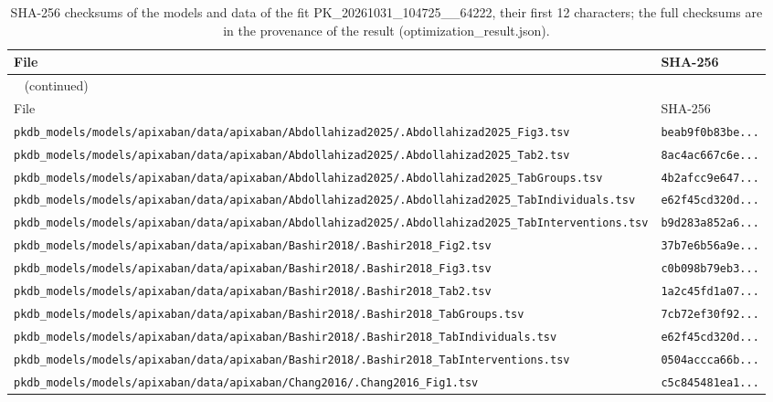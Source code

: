 \documentclass{article}
\begin{document}
\begin{longtable}{ll}
\caption{SHA-256 checksums of the models and data of the fit PK\_20261031\_104725\_\_64222, their first 12 characters; the full checksums are in the provenance of the result (optimization\_result.json).}\label{tab:checksums:PK_20261031_104725__64222} \\
\toprule
File & SHA-256 \\
\midrule
\endfirsthead
\multicolumn{2}{l}{\small\tablename~\thetable{} (continued)} \\
\toprule
File & SHA-256 \\
\midrule
\endhead
\bottomrule
\endlastfoot
\texttt{pkdb\_models/models/apixaban/data/apixaban/Abdollahizad2025/.Abdollahizad2025\_Fig3.tsv} & \texttt{beab9f0b83be...} \\
\texttt{pkdb\_models/models/apixaban/data/apixaban/Abdollahizad2025/.Abdollahizad2025\_Tab2.tsv} & \texttt{8ac4ac667c6e...} \\
\texttt{pkdb\_models/models/apixaban/data/apixaban/Abdollahizad2025/.Abdollahizad2025\_TabGroups.tsv} & \texttt{4b2afcc9e647...} \\
\texttt{pkdb\_models/models/apixaban/data/apixaban/Abdollahizad2025/.Abdollahizad2025\_TabIndividuals.tsv} & \texttt{e62f45cd320d...} \\
\texttt{pkdb\_models/models/apixaban/data/apixaban/Abdollahizad2025/.Abdollahizad2025\_TabInterventions.tsv} & \texttt{b9d283a852a6...} \\
\texttt{pkdb\_models/models/apixaban/data/apixaban/Bashir2018/.Bashir2018\_Fig2.tsv} & \texttt{37b7e6b56a9e...} \\
\texttt{pkdb\_models/models/apixaban/data/apixaban/Bashir2018/.Bashir2018\_Fig3.tsv} & \texttt{c0b098b79eb3...} \\
\texttt{pkdb\_models/models/apixaban/data/apixaban/Bashir2018/.Bashir2018\_Tab2.tsv} & \texttt{1a2c45fd1a07...} \\
\texttt{pkdb\_models/models/apixaban/data/apixaban/Bashir2018/.Bashir2018\_TabGroups.tsv} & \texttt{7cb72ef30f92...} \\
\texttt{pkdb\_models/models/apixaban/data/apixaban/Bashir2018/.Bashir2018\_TabIndividuals.tsv} & \texttt{e62f45cd320d...} \\
\texttt{pkdb\_models/models/apixaban/data/apixaban/Bashir2018/.Bashir2018\_TabInterventions.tsv} & \texttt{0504accca66b...} \\
\texttt{pkdb\_models/models/apixaban/data/apixaban/Chang2016/.Chang2016\_Fig1.tsv} & \texttt{c5c845481ea1...} \\

\end{longtable}
\end{document}
